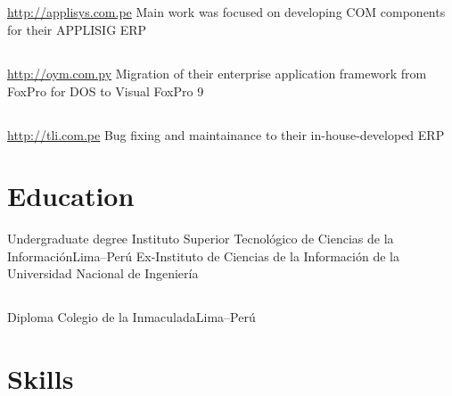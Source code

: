 \documentclass[11pt,a4paper,english]{moderncv}
\begin{document}
\subsection{}

{
\url{http://applisys.com.pe}
\newline{}
Main work was focused on developing COM components for their APPLISIG ERP
}

\subsection{}

{
\url{http://oym.com.py}
\newline{}
Migration of their enterprise application framework from FoxPro for DOS to Visual FoxPro 9
}

\subsection{}

{
\url{http://tli.com.pe}
\newline{}
Bug fixing and maintainance to their in-house-developed ERP
}

\subsection{}

\section{Education}
    {Undergraduate degree}
    {Instituto Superior Tecnológico de Ciencias de la Información}{Lima--Perú}
    {}{Ex-Instituto de Ciencias de la Información de la Universidad Nacional de Ingeniería}

\subsection{}

    {Diploma}
    {Colegio de la Inmaculada}{Lima--Perú}
    {}{}

\clearpage
    
\section{Skills}
\end{document}
